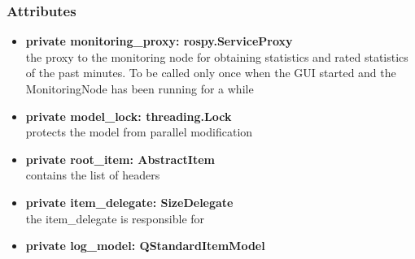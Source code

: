 \subsubsection{Attributes}
\begin{itemize}
  \item \textbf{private monitoring\_proxy: rospy.ServiceProxy}\\ 
  the proxy to the monitoring node for obtaining statistics and rated statistics of the past minutes. To be called only once when the GUI started and the MonitoringNode has been running for a while
  \item \textbf{private model\_lock: threading.Lock}\\ 
  protects the model from parallel modification
  \item \textbf{private root\_item: AbstractItem}\\
  contains the list of headers
  \item \textbf{private item\_delegate: SizeDelegate}\\
  the item\_delegate is responsible for 
  \item \textbf{private log\_model: QStandardItemModel}\\
   
\end{itemize}
